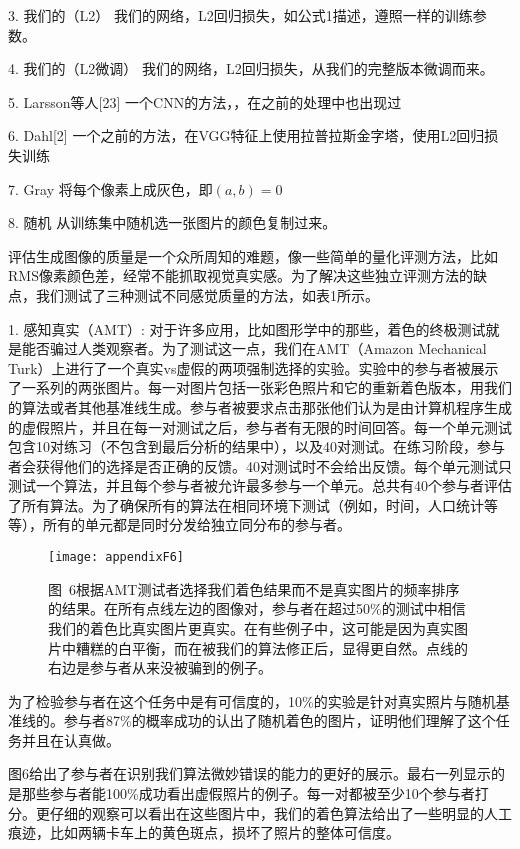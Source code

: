 3. {\heiti 我们的（L2）} 我们的网络，L2回归损失，如公式1描述，遵照一样的训练参数。

4. {\heiti 我们的（L2微调）} 我们的网络，L2回归损失，从我们的完整版本微调而来。

5. {\heiti Larsson等人[23]} 一个CNN的方法，，在之前的处理中也出现过

6. {\heiti Dahl[2]} 一个之前的方法，在VGG特征上使用拉普拉斯金字塔，使用L2回归损失训练

7. {\heiti Gray} 将每个像素上成灰色，即$(a,b)=0$

8. {\heiti 随机} 从训练集中随机选一张图片的颜色复制过来。

评估生成图像的质量是一个众所周知的难题，像一些简单的量化评测方法，比如RMS像素颜色差，经常不能抓取视觉真实感。为了解决这些独立评测方法的缺点，我们测试了三种测试不同感觉质量的方法，如表1所示。

1. {\heiti 感知真实（AMT）: } 对于许多应用，比如图形学中的那些，着色的终极测试就是能否骗过人类观察者。为了测试这一点，我们在AMT（Amazon Mechanical Turk）上进行了一个真实vs虚假的两项强制选择的实验。实验中的参与者被展示了一系列的两张图片。每一对图片包括一张彩色照片和它的重新着色版本，用我们的算法或者其他基准线生成。参与者被要求点击那张他们认为是由计算机程序生成的虚假照片，并且在每一对测试之后，参与者有无限的时间回答。每一个单元测试包含10对练习（不包含到最后分析的结果中），以及40对测试。在练习阶段，参与者会获得他们的选择是否正确的反馈。40对测试时不会给出反馈。每个单元测试只测试一个算法，并且每个参与者被允许最多参与一个单元。总共有40个参与者评估了所有算法。为了确保所有的算法在相同环境下测试（例如，时间，人口统计等等），所有的单元都是同时分发给独立同分布的参与者。

\begin{figure}[h]
  \centering
  \texttt{[image: appendixF6]}
  \caption*{图~6\quad 根据AMT测试者选择我们着色结果而不是真实图片的频率排序的结果。在所有点线左边的图像对，参与者在超过50\%的测试中相信我们的着色比真实图片更真实。在有些例子中，这可能是因为真实图片中糟糕的白平衡，而在被我们的算法修正后，显得更自然。点线的右边是参与者从来没被骗到的例子。}
  \label{tab:badfigure7}
\end{figure}

为了检验参与者在这个任务中是有可信度的，10\%的实验是针对真实照片与随机基准线的。参与者87\%的概率成功的认出了随机着色的图片，证明他们理解了这个任务并且在认真做。

图6给出了参与者在识别我们算法微妙错误的能力的更好的展示。最右一列显示的是那些参与者能100\%成功看出虚假照片的例子。每一对都被至少10个参与者打分。更仔细的观察可以看出在这些图片中，我们的着色算法给出了一些明显的人工痕迹，比如两辆卡车上的黄色斑点，损坏了照片的整体可信度。

